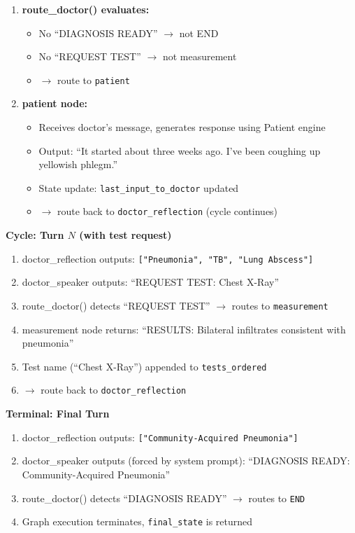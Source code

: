 \begin{acadbox}[\textcolor{white}{What Happens}]
\begin{enumerate}
    \item \textbf{route\_doctor() evaluates:}
    \begin{itemize}
        \item No ``DIAGNOSIS READY'' $\rightarrow$ not END
        \item No ``REQUEST TEST'' $\rightarrow$ not measurement
        \item $\rightarrow$ route to \texttt{patient}
    \end{itemize}
    
    \item \textbf{patient node:}
    \begin{itemize}
        \item Receives doctor's message, generates response using Patient engine
        \item Output: ``It started about three weeks ago. I've been coughing up yellowish phlegm.''
        \item State update: \texttt{last\_input\_to\_doctor} updated
        \item $\rightarrow$ route back to \texttt{doctor\_reflection} (cycle continues)
    \end{itemize}
\end{enumerate}

\textbf{Cycle: Turn $N$ (with test request)}
\begin{enumerate}
    \item doctor\_reflection outputs: \texttt{["Pneumonia", "TB", "Lung Abscess"]}
    \item doctor\_speaker outputs: ``REQUEST TEST: Chest X-Ray''
    \item route\_doctor() detects ``REQUEST TEST'' $\rightarrow$ routes to \texttt{measurement}
    \item measurement node returns: ``RESULTS: Bilateral infiltrates consistent with pneumonia''
    \item Test name (``Chest X-Ray'') appended to \texttt{tests\_ordered}
    \item $\rightarrow$ route back to \texttt{doctor\_reflection}
\end{enumerate}

\textbf{Terminal: Final Turn}
\begin{enumerate}
    \item doctor\_reflection outputs: \texttt{["Community-Acquired Pneumonia"]}
    \item doctor\_speaker outputs (forced by system prompt): ``DIAGNOSIS READY: Community-Acquired Pneumonia''
    \item route\_doctor() detects ``DIAGNOSIS READY'' $\rightarrow$ routes to \texttt{END}
    \item Graph execution terminates, \texttt{final\_state} is returned
\end{enumerate}
\end{acadbox}

